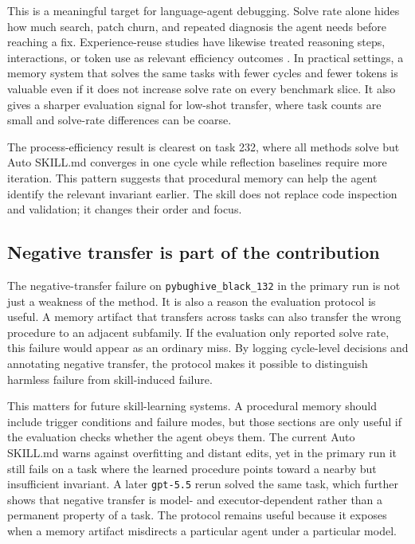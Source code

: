 This is a meaningful target for language-agent debugging. Solve rate alone hides how much search, patch churn, and repeated diagnosis the agent needs before reaching a fix. Experience-reuse studies have likewise treated reasoning steps, interactions, or token use as relevant efficiency outcomes \cite{qian2024ice,ouyang2026reasoningbank}. In practical settings, a memory system that solves the same tasks with fewer cycles and fewer tokens is valuable even if it does not increase solve rate on every benchmark slice. It also gives a sharper evaluation signal for low-shot transfer, where task counts are small and solve-rate differences can be coarse.

The process-efficiency result is clearest on task 232, where all methods solve but Auto SKILL.md converges in one cycle while reflection baselines require more iteration. This pattern suggests that procedural memory can help the agent identify the relevant invariant earlier. The skill does not replace code inspection and validation; it changes their order and focus.

\subsection{Negative transfer is part of the contribution}
\label{sec:discussion_negative_transfer}

The negative-transfer failure on \texttt{pybughive\_black\_132} in the primary run is not just a weakness of the method. It is also a reason the evaluation protocol is useful. A memory artifact that transfers across tasks can also transfer the wrong procedure to an adjacent subfamily. If the evaluation only reported solve rate, this failure would appear as an ordinary miss. By logging cycle-level decisions and annotating negative transfer, the protocol makes it possible to distinguish harmless failure from skill-induced failure.

This matters for future skill-learning systems. A procedural memory should include trigger conditions and failure modes, but those sections are only useful if the evaluation checks whether the agent obeys them. The current Auto SKILL.md warns against overfitting and distant edits, yet in the primary run it still fails on a task where the learned procedure points toward a nearby but insufficient invariant. A later \texttt{gpt-5.5} rerun solved the same task, which further shows that negative transfer is model- and executor-dependent rather than a permanent property of a task. The protocol remains useful because it exposes when a memory artifact misdirects a particular agent under a particular model.

